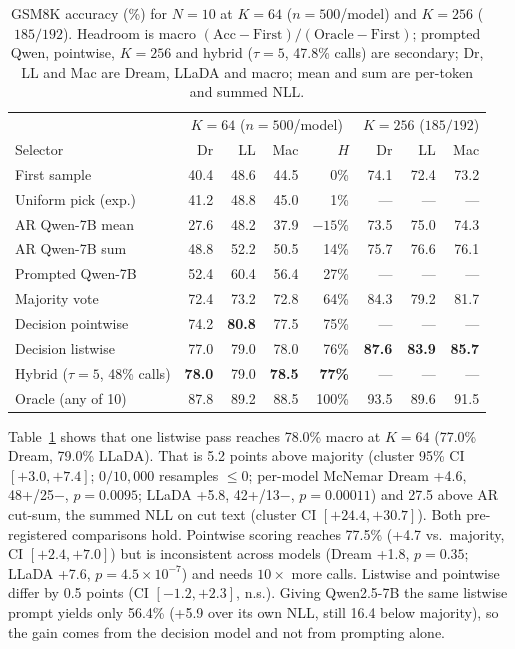 \begin{table}[!t]
\centering
\caption{GSM8K accuracy (\%) for $N=10$ at $K=64$ ($n=500$/model) and $K=256$ ($185/192$). Headroom is macro $(\text{Acc}-\text{First})/(\text{Oracle}-\text{First})$; prompted Qwen, pointwise, $K=256$ and hybrid ($\tau=5$, 47.8\% calls) are secondary; Dr, LL and Mac are Dream, LLaDA and macro; mean and sum are per-token and summed NLL.}
\label{tab:gsm8k}
\scriptsize
\setlength{\tabcolsep}{2.0pt}
\begin{tabular}{@{}lrrrr|rrr@{}}
\toprule
 & \multicolumn{4}{c|}{$K=64$ ($n=500$/model)} & \multicolumn{3}{c}{$K=256$ ($185/192$)} \\
Selector & Dr & LL & Mac & $H$ & Dr & LL & Mac \\
\midrule
First sample & 40.4 & 48.6 & 44.5 & 0\% & 74.1 & 72.4 & 73.2 \\
Uniform pick (exp.) & 41.2 & 48.8 & 45.0 & 1\% & --- & --- & --- \\
AR Qwen-7B mean & 27.6 & 48.2 & 37.9 & $-15\%$ & 73.5 & 75.0 & 74.3 \\
AR Qwen-7B sum & 48.8 & 52.2 & 50.5 & 14\% & 75.7 & 76.6 & 76.1 \\
Prompted Qwen-7B & 52.4 & 60.4 & 56.4 & 27\% & --- & --- & --- \\
Majority vote & 72.4 & 73.2 & 72.8 & 64\% & 84.3 & 79.2 & 81.7 \\
Decision pointwise & 74.2 & \textbf{80.8} & 77.5 & 75\% & --- & --- & --- \\
Decision listwise & 77.0 & 79.0 & 78.0 & 76\% & \textbf{87.6} & \textbf{83.9} & \textbf{85.7} \\
Hybrid ($\tau=5$, 48\% calls) & \textbf{78.0} & 79.0 & \textbf{78.5} & \textbf{77\%} & --- & --- & --- \\
\midrule
Oracle (any of 10) & 87.8 & 89.2 & 88.5 & 100\% & 93.5 & 89.6 & 91.5 \\
\bottomrule
\end{tabular}
\end{table}

Table~\ref{tab:gsm8k} shows that one listwise pass reaches 78.0\% macro at $K=64$ (77.0\% Dream, 79.0\% LLaDA). That is 5.2 points above majority (cluster 95\% CI $[+3.0,+7.4]$; $0/10,000$ resamples $\le 0$; per-model McNemar Dream +4.6, 48+/25$-$, $p=0.0095$; LLaDA +5.8, 42+/13$-$, $p=0.00011$) and 27.5 above AR cut-sum, the summed NLL on cut text (cluster CI $[+24.4,+30.7]$). Both pre-registered comparisons hold. Pointwise scoring reaches 77.5\% (+4.7 vs.\ majority, CI $[+2.4,+7.0]$) but is inconsistent across models (Dream +1.8, $p=0.35$; LLaDA +7.6, $p=4.5\times 10^{-7}$) and needs $10\times$ more calls. Listwise and pointwise differ by 0.5 points (CI $[-1.2,+2.3]$, n.s.). Giving Qwen2.5-7B the same listwise prompt yields only 56.4\% (+5.9 over its own NLL, still 16.4 below majority), so the gain comes from the decision model and not from prompting alone.

